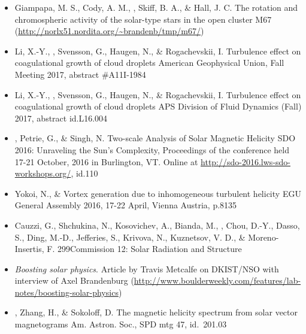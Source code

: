 \begin{itemize}
\item[{54.}~]
Giampapa, M. S., Cody, A. M., \Brandenburg, Skiff, B. A., \& Hall, J. C.
{The rotation and chromospheric activity of the solar-type stars in the open cluster M67}
{(\url{http://norlx51.nordita.org/~brandenb/tmp/m67/})}

\item[{53.}~]
Li, X.-Y., \Brandenburg, Svensson, G., Haugen, N., \& Rogachevskii, I.
{Turbulence effect on coagulational growth of cloud droplets}
{American Geophysical Union, Fall Meeting 2017, abstract \#A11I-1984}

\item[{52.}~]
Li, X.-Y., \Brandenburg, Svensson, G., Haugen, N., \& Rogachevskii, I.
{Turbulence effect on coagulational growth of cloud droplets}
{APS Division of Fluid Dynamics (Fall) 2017, abstract id.L16.004}

\item[{51.}~]
\Brandenburg, Petrie, G., \& Singh, N.
{Two-scale Analysis of Solar Magnetic Helicity}
{SDO 2016: Unraveling the Sun's Complexity, Proceedings of the
conference held 17-21 October, 2016 in Burlington, VT. Online at
\url{http://sdo-2016.lws-sdo-workshops.org/}, id.110}

\item[{50.}~]
Yokoi, N., \& \Brandenburg{}
{Vortex generation due to inhomogeneous turbulent helicity}
{EGU General Assembly 2016, 17-22 April, Vienna Austria, p.8135}

\item[{49.}~]
Cauzzi, G., Shchukina, N., Kosovichev, A., Bianda, M., \Brandenburg, Chou, D.-Y., Dasso, S., Ding, M.-D., Jefferies, S., Krivova, N., Kuznetsov, V. D., \& Moreno-Insertis, F.
{299}{Commission 12: Solar Radiation and Structure}

\item[{48.}~]
{\it Boosting solar physics}. Article by Travis Metcalfe on
DKIST/NSO with interview of Axel Brandenburg
(\url{http://www.boulderweekly.com/features/lab-notes/boosting-solar-physics})

\item[{47.}~]
\Brandenburg, Zhang, H., \& Sokoloff, D.
{The magnetic helicity spectrum from solar vector magnetograms}
{Am. Astron. Soc., SPD mtg 47, id.\ 201.03}


\end{itemize}
